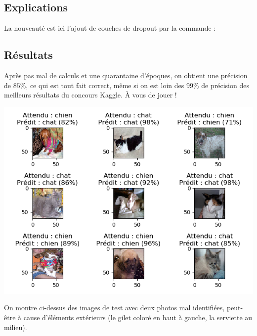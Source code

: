 \documentclass[11pt,class=report,crop=false]{standalone}
\begin{document}
\subsection{Explications}

La nouveauté est ici l'ajout de couches de dropout par la commande :


\subsection{Résultats}

Après pas mal de calculs et une quarantaine d'époques, on obtient une précision de $85\%$, ce qui est tout fait correct, même si on est loin des $99\%$ de précision des meilleurs résultats du concours \og{}Kaggle\fg{}. \`A vous de jouer !

\begin{center}
\includegraphics[scale=\myscale,scale=0.9]{figures/tfconv-chienchat-test}
\end{center}

On montre ci-dessus des images de test avec deux photos mal identifiées, peut-être à cause d'éléments extérieurs (le gilet coloré en haut à gauche, la serviette au milieu).




\end{document}
